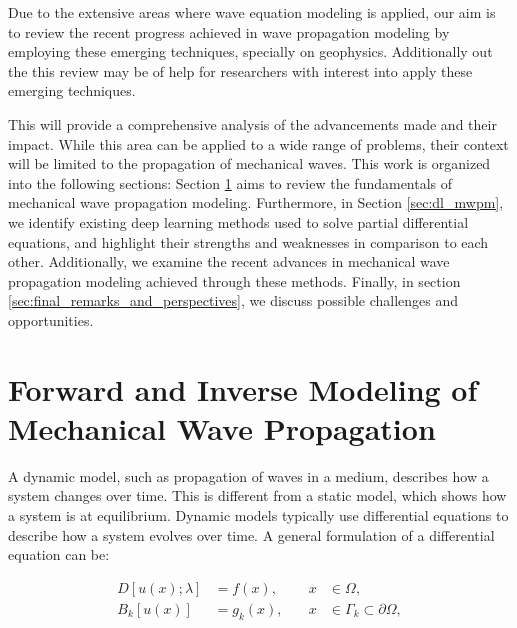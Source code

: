 \documentclass{tufte-handout}
\begin{document}
Due to the extensive areas where wave equation modeling is applied, our aim is to review the recent progress achieved in wave propagation modeling by employing these emerging techniques, specially on geophysics. Additionally out the this review may be of help for researchers with interest into apply these emerging techniques.

This will provide a comprehensive analysis of the advancements made and their impact. While this area can be applied to a wide range of problems, their context will be limited to the propagation of mechanical waves. This work is organized into the following sections: Section \ref{sec:fordward_inverse_modeling_mechanical_waves} aims to review the fundamentals of mechanical wave propagation modeling. Furthermore, in Section \ref{sec:dl_mwpm}, we identify existing deep learning methods used to solve partial differential equations, and highlight their strengths and weaknesses in comparison to each other. Additionally, we examine the recent advances in mechanical wave propagation modeling achieved through these methods. Finally, in section \ref{sec:final_remarks_and_perspectives}, we discuss possible challenges and opportunities.

\section{Forward and Inverse Modeling of Mechanical Wave Propagation}\label{sec:fordward_inverse_modeling_mechanical_waves}
 


A dynamic model, such as propagation of waves in a medium, describes how a system changes over time. This is different from a static model, which shows how a system is at equilibrium. Dynamic models typically use differential equations to describe how a system evolves over time. A general formulation of a differential equation can be:

\begin{equation}
\begin{aligned}
D[u(x); \lambda] &= f(x), & \quad x &\in \Omega,\\\label{eq:pde}
B_k[u(x)] &= g_k(x), & \quad x &\in \Gamma_k \subset \partial\Omega,
\end{aligned}
\end{equation}
\end{document}
